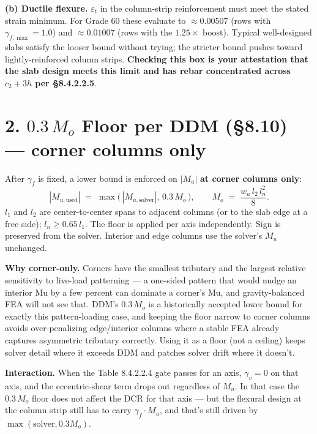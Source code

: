 \documentclass[10pt]{article}
\begin{document}
\vspace{2pt}

\noindent\textbf{(b) Ductile flexure.} $\varepsilon_t$ in the column-strip reinforcement must meet the stated strain minimum. For Grade 60 these evaluate to $\approx 0.00507$ (rows with $\gamma_{f,\max} = 1.0$) and $\approx 0.01007$ (rows with the $1.25\times$ boost). Typical well-designed slabs satisfy the looser bound without trying; the stricter bound pushes toward lightly-reinforced column strips. \textbf{Checking this box is your attestation that the slab design meets this limit and has rebar concentrated across $c_2 + 3h$ per \S 8.4.2.2.5}.

\section*{2. $0.3\,M_o$ Floor per DDM (\S 8.10) --- corner columns only}
After $\gamma_f$ is fixed, a lower bound is enforced on $|M_u|$ \textbf{at corner columns only}:
\[
|M_{u,\text{used}}|
\;=\; \max\!\bigl(\,|M_{u,\text{solver}}|,\, 0.3\, M_o\,\bigr), \qquad
M_o \;=\; \frac{w_u\, l_2\, l_n^2}{8}.
\]
$l_1$ and $l_2$ are center-to-center spans to adjacent columns (or to the slab edge at a free side); $l_n \geq 0.65\,l_1$. The floor is applied per axis independently. Sign is preserved from the solver. Interior and edge columns use the solver's $M_u$ unchanged.

\vspace{3pt}

\noindent\textbf{Why corner-only.} Corners have the smallest tributary and the largest relative sensitivity to live-load patterning --- a one-sided pattern that would nudge an interior Mu by a few percent can dominate a corner's Mu, and gravity-balanced FEA will not see that. DDM's $0.3\,M_o$ is a historically accepted lower bound for exactly this pattern-loading case, and keeping the floor narrow to corner columns avoids over-penalizing edge/interior columns where a stable FEA already captures asymmetric tributary correctly. Using it as a floor (not a ceiling) keeps solver detail where it exceeds DDM and patches solver drift where it doesn't.

\vspace{2pt}

\noindent\textbf{Interaction.} When the Table 8.4.2.2.4 gate passes for an axis, $\gamma_v = 0$ on that axis, and the eccentric-shear term drops out regardless of $M_u$. In that case the $0.3\,M_o$ floor does not affect the DCR for that axis --- but the flexural design at the column strip still has to carry $\gamma_f \cdot M_u$, and that's still driven by $\max(\text{solver}, 0.3 M_o)$.
\end{document}
